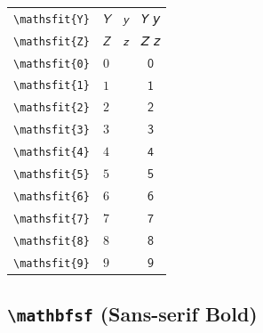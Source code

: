 \documentclass[12pt,a4paper]{article}
\begin{document}
\begin{longtable}{|c|c|c|c|}
\verb|\mathsfit{Y}| & $\mathsfit{Y}$ & $\mathsfit{y}$ & 𝘠 𝘺 \\
\verb|\mathsfit{Z}| & $\mathsfit{Z}$ & $\mathsfit{z}$ & 𝘡 𝘻 \\
\verb|\mathsfit{0}| & $\mathsfit{0}$ & & $ 𝟢 $ \\
\verb|\mathsfit{1}| & $\mathsfit{1}$ & & $ 𝟣 $ \\
\verb|\mathsfit{2}| & $\mathsfit{2}$ & & $ 𝟤 $ \\
\verb|\mathsfit{3}| & $\mathsfit{3}$ & & $ 𝟥 $ \\
\verb|\mathsfit{4}| & $\mathsfit{4}$ & & $ 𝟦 $ \\
\verb|\mathsfit{5}| & $\mathsfit{5}$ & & $ 𝟧 $ \\
\verb|\mathsfit{6}| & $\mathsfit{6}$ & & $ 𝟨 $ \\
\verb|\mathsfit{7}| & $\mathsfit{7}$ & & $ 𝟩 $ \\
\verb|\mathsfit{8}| & $\mathsfit{8}$ & & $ 𝟪 $ \\
\verb|\mathsfit{9}| & $\mathsfit{9}$ & & $ 𝟫 $ \\
\hline
\end{longtable}

\newpage

\subsection*{\texttt{\textbackslash{}mathbfsf} (Sans-serif Bold)}
\end{document}

